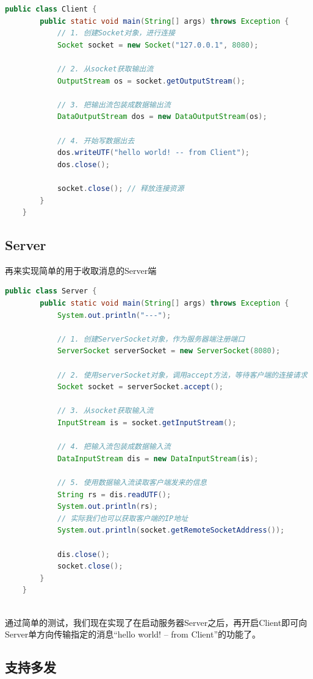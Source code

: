 \documentclass{article}
\begin{document}
	\begin{lstlisting}[language=Java, title=简单实现Client, tabsize=4]
	public class Client {
		public static void main(String[] args) throws Exception {
			// 1. 创建Socket对象，进行连接
			Socket socket = new Socket("127.0.0.1", 8080);
			
			// 2. 从socket获取输出流
			OutputStream os = socket.getOutputStream();
			
			// 3. 把输出流包装成数据输出流
			DataOutputStream dos = new DataOutputStream(os);
			
			// 4. 开始写数据出去
			dos.writeUTF("hello world! -- from Client");
			dos.close();
			
			socket.close(); // 释放连接资源
		}
	}
	\end{lstlisting}
	
	\subsection{Server}
	
	再来实现简单的用于收取消息的Server端
	
	\begin{lstlisting}[language=Java, title=简单实现Server, tabsize=4]
	public class Server {
		public static void main(String[] args) throws Exception {
			System.out.println("---");
			
			// 1. 创建ServerSocket对象，作为服务器端注册端口
			ServerSocket serverSocket = new ServerSocket(8080);
			
			// 2. 使用serverSocket对象，调用accept方法，等待客户端的连接请求
			Socket socket = serverSocket.accept();
			
			// 3. 从socket获取输入流
			InputStream is = socket.getInputStream();
			
			// 4. 把输入流包装成数据输入流
			DataInputStream dis = new DataInputStream(is);
			
			// 5. 使用数据输入流读取客户端发来的信息
			String rs = dis.readUTF();
			System.out.println(rs);
			// 实际我们也可以获取客户端的IP地址
			System.out.println(socket.getRemoteSocketAddress());
			
			dis.close();
			socket.close();
		}
	}
	
	\end{lstlisting}
	
	通过简单的测试，我们现在实现了在启动服务器Server之后，再开启Client即可向Server单方向传输指定的消息“hello world! -- from Client”的功能了。
	
	\subsection{支持多发}
	
\end{document}
